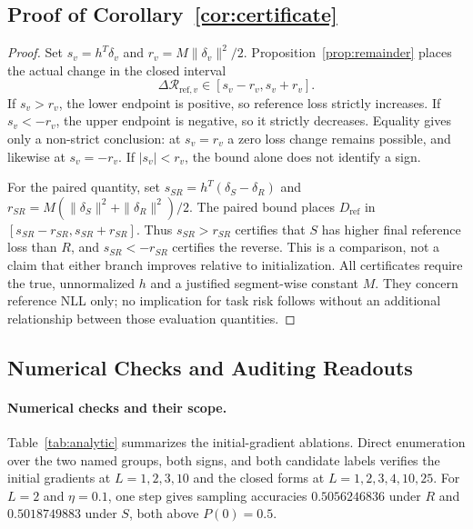 \subsection{Proof of Corollary~\ref{cor:certificate}}
\begin{proof}
Set $s_v=h^T\delta_v$ and $r_v=M\|\delta_v\|^2/2$. Proposition~\ref{prop:remainder}
places the actual change in the closed interval
\[
 \Delta\mathcal R_{\mathrm{ref},v}\in[s_v-r_v,s_v+r_v].
\]
If $s_v>r_v$, the lower endpoint is positive, so reference loss strictly
increases. If $s_v<-r_v$, the upper endpoint is negative, so it strictly
decreases. Equality gives only a non-strict conclusion: at $s_v=r_v$ a
zero loss change remains possible, and likewise at $s_v=-r_v$.
If $|s_v|<r_v$, the bound alone does not identify a sign.

For the paired quantity, set
$s_{SR}=h^T(\delta_S-\delta_R)$ and
$r_{SR}=M(\|\delta_S\|^2+\|\delta_R\|^2)/2$. The paired bound places
$D_{\mathrm{ref}}$ in $[s_{SR}-r_{SR},s_{SR}+r_{SR}]$. Thus
$s_{SR}>r_{SR}$ certifies that $S$ has higher final reference loss than
$R$, and $s_{SR}<-r_{SR}$ certifies the reverse. This is a comparison,
not a claim that either branch improves relative to initialization.
All certificates require the true, unnormalized $h$ and a justified
segment-wise constant $M$. They concern reference NLL only; no implication
for task risk follows without an additional relationship between those
evaluation quantities.
\end{proof}

\subsection{Numerical Checks and Auditing Readouts}
\label{app:numerical-readouts}

\paragraph{Numerical checks and their scope.}
Table~\ref{tab:analytic} summarizes the initial-gradient ablations.
Direct enumeration over the two named groups, both signs, and both candidate
labels verifies
the initial gradients at $L=1,2,3,10$ and the closed forms at
$L=1,2,3,4,10,25$. For $L=2$ and $\eta=0.1$, one step gives sampling
accuracies $0.5056246836$ under $R$ and $0.5018749883$ under $S$, both above
$P(0)=0.5$.

